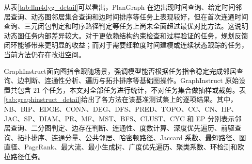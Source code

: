 从表\ref{tab:llm4dyg_detail}可以看出，PlanGraph 在边出现时间查询、给定时间邻居查询、动态图邻居集合查询和边时间排序等任务上表现较好，但在首次连通时间查询、三元闭包判定和时序路径判定等任务上尚未全面超过最优对比方法。这说明动态图任务内部差异较大。对于更依赖结构约束检查和过程验证的任务，规划反馈闭环能够带来更明显的收益；而对于需要细粒度时间建模或连续状态跟踪的任务，当前方法仍存在改进空间。

GraphInstruct\cite{graphinstruct2024}面向图指令跟随场景，强调模型能否根据任务指令稳定完成邻居查询、边判断、连通性分析、遍历与拓扑排序等基础图操作。GraphInstruct 原始设置共包含 21 个任务，本文对全部任务进行统计，不对任务集合做抽样或裁剪。表\ref{tab:graphinstruct_detail}给出了各方法在该基准测试集上的逐项结果。其中，NB、BIP、EDGE、CONN、DEG、DFS、PRED、TOPO、CC、CN、HP、JAC、SP、DIAM、PR、MF、MST、BFS、CLUST、CYC 和 EP 分别表示邻居查询、二分图判定、边存在判断、连通性、度数计算、深度优先遍历、前驱查询、拓扑排序、连通分量、公共邻居、哈密顿路径、Jaccard 系数、最短路径、图直径、PageRank、最大流、最小生成树、广度优先遍历、聚类系数、环检测和欧拉路径任务。

